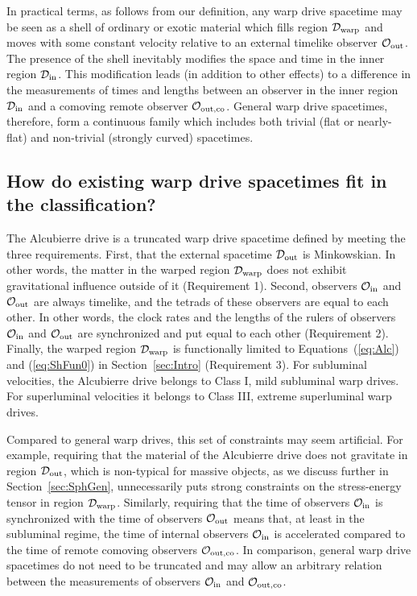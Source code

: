 \documentclass[10pt]{iopart}
\begin{document}
In practical terms, as follows from our definition, any warp drive spacetime may be seen as a shell of ordinary or exotic material which fills region $\mathcal{D}_{\rm warp}$ and moves with some constant velocity relative to an external timelike observer $\mathcal{O}_{\rm out}$. The presence of the shell inevitably modifies the space and time in the inner region $\mathcal{D}_{\rm in}$. This modification leads (in addition to other effects) to a difference in the measurements of times and lengths between an observer in the inner region $\mathcal{D}_{\rm in}$ and a comoving remote observer $\mathcal{O}_{\rm out, co}$. General warp drive spacetimes, therefore, form a continuous family which includes both trivial (flat or nearly-flat) and non-trivial (strongly curved) spacetimes.


\subsection{How do existing warp drive spacetimes fit in the classification?}
\label{sec:ClassReview}
The Alcubierre drive is a truncated warp drive spacetime defined by meeting the three requirements. First, that the external spacetime $\mathcal{D}_{\rm out}$ is Minkowskian. In other words, the matter in the warped region $\mathcal{D}_{\rm warp}$ does not exhibit gravitational influence outside of it (Requirement 1). Second, observers $\mathcal{O}_{\rm in}$ and $\mathcal{O}_{\rm out}$ are always timelike, and the tetrads of these observers are equal to each other. In other words, the clock rates and the lengths of the rulers of observers $\mathcal{O}_{\rm in}$ and $\mathcal{O}_{\rm out}$ are synchronized and put equal to each other (Requirement 2). Finally, the warped region $\mathcal{D}_{\rm warp}$ is functionally limited to Equations~(\ref{eq:Alc}) and (\ref{eq:ShFun0}) in Section~\ref{sec:Intro} (Requirement 3). For subluminal velocities, the Alcubierre drive belongs to Class I, mild subluminal warp drives. For superluminal velocities it belongs to Class III, extreme superluminal warp drives.

Compared to general warp drives, this set of constraints may seem artificial. For example, requiring that the material of the Alcubierre drive does not gravitate in region $\mathcal{D}_{\rm out}$, which is non-typical for massive objects, as we discuss further in Section~\ref{sec:SphGen}, unnecessarily puts strong constraints on the stress-energy tensor in region $\mathcal{D}_{\rm warp}$. Similarly, requiring that the time of observers $\mathcal{O}_{\rm in}$ is synchronized with the time of observers $\mathcal{O}_{\rm out}$ means that, at least in the subluminal regime, the time of internal observers $\mathcal{O}_{\rm in}$ is accelerated compared to the time of remote comoving observers $\mathcal{O}_{\rm out, co}$. In comparison, general warp drive spacetimes do not need to be truncated and may allow an arbitrary relation between the measurements of observers $\mathcal{O}_{\rm in}$ and $\mathcal{O}_{\rm out, co}$. 
\end{document}
